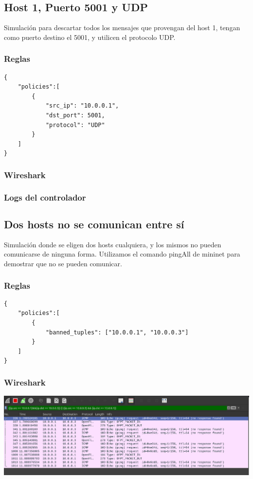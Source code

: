\documentclass{article}
\begin{document}
\subsection{Host 1, Puerto 5001 y UDP}
Simulación para descartar todos los mensajes que provengan del host 1, tengan como puerto destino el 5001, y utilicen el protocolo UDP.

\subsubsection{Reglas}
\begin{verbatim}
{
    "policies":[
        {
            "src_ip": "10.0.0.1",
            "dst_port": 5001,
            "protocol": "UDP"
        }
    ]
}
\end{verbatim}

\subsubsection{Wireshark}
\begin{center}
\end{center}

\subsubsection{Logs del controlador}
\begin{center}
\end{center}

\subsection{Dos hosts no se comunican entre sí}
Simulación donde se eligen dos hosts cualquiera, y los mismos no pueden comunicarse de ninguna forma. Utilizamos el comando pingAll de mininet para demostrar que no se pueden comunicar.

\subsubsection{Reglas}
\begin{verbatim}
{
    "policies":[
        {
            "banned_tuples": ["10.0.0.1", "10.0.0.3"]
        }
    ]
}
\end{verbatim}

\subsubsection{Wireshark}
\begin{center}
\includegraphics[scale=0.35]{Banned_Tuple_WS.png}
\end{center}
\end{document}
